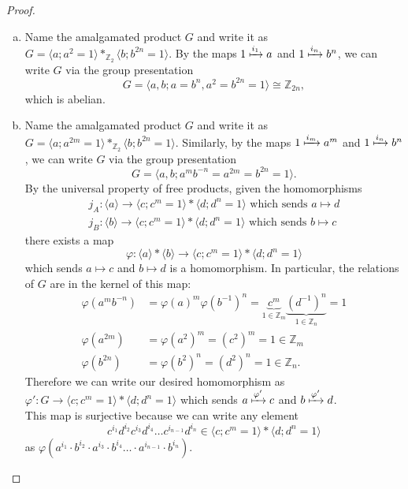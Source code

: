 \documentclass{article}
\begin{document}
\begin{proof} \text{} \\
  \begin{enumerate}[a.]
    \item Name the amalgamated product $G$ and write it as
    $G = \langle a; a^2 = 1\rangle *_{\mathbb Z_2} \langle b; b^{2n} = 1\rangle$.
    By the maps $1 \xmapsto{i_1} a$ and $1 \xmapsto{i_n} b^n$, we can write
    $G$ via the group presentation \[
      G = \langle a, b; a = b^n, a^2 = b^{2n} = 1 \rangle \cong \mathbb Z_{2n},
    \]
    which is abelian.
    \item Name the amalgamated product $G$ and write it as
    $G = \langle a; a^{2m} = 1\rangle *_{\mathbb Z_2} \langle b; b^{2n} = 1\rangle$.
    Similarly, by the maps
    $1 \xmapsto{i_m} a^m$ and $1 \xmapsto{i_n} b^n$, we can write $G$ via the
    group presentation \[
      G = \langle a, b; a^mb^{-n} = a^{2m} = b^{2n} = 1 \rangle.
    \]
    By the universal property of free products, given the homomorphisms \begin{align*}
      j_A \colon \langle a \rangle \rightarrow
      \langle c; c^{m} = 1 \rangle
      * \langle d; d^{n} = 1 \rangle
      \text{ which sends } a \mapsto d
      \\
      j_B \colon \langle b \rangle \rightarrow
      \langle c; c^{m} = 1 \rangle
      * \langle d; d^{n} = 1 \rangle
      \text{ which sends } b \mapsto c
    \end{align*}
    there exists a map \[
      \varphi\colon \langle a \rangle * \langle b \rangle
      \rightarrow \langle c; c^{m} = 1 \rangle * \langle d; d^{n} = 1 \rangle
    \] which sends $a \mapsto c$ and $b \mapsto d$ is a homomorphism.
    In particular, the relations of $G$ are in the kernel of this map: \begin{align*}
      \varphi(a^m b^{-n})
        &= \varphi(a)^m\varphi(b^{-1})^n
        = \underbrace{c^m}_{1 \in \mathbb Z_m} \underbrace{(d^{-1})^n}_{1 \in \mathbb Z_n}
        = 1
      \\
      \varphi(a^{2m})
        &= \varphi(a^2)^m
        = (c^2)^m
        = 1 \in \mathbb Z_m
      \\
      \varphi(b^{2n})
        &= \varphi(b^2)^n
        = (d^2)^n
        = 1 \in \mathbb Z_n.
    \end{align*}
    Therefore we can write our desired homomorphism as
    $\varphi'\colon G \rightarrow \langle c; c^{m} = 1 \rangle * \langle d; d^{n} = 1 \rangle$
    which sends $a\xmapsto{\varphi'}c$ and $b\xmapsto{\varphi'}d$.
    \\
    This map is surjective because we can write any element \[
      c^{i_1}d^{i_2}c^{i_3}d^{i_4}\hdots c^{i_{n-1}}d^{i_n} \in
      \langle c; c^m = 1 \rangle * \langle d; d^n = 1 \rangle
    \]
    as $\varphi(a^{i_1}\cdot b^{i_2}\cdot a^{i_3}\cdot b^{i_4}\hdots \cdot a^{i_{n-1}}\cdot b^{i_n})$.


\end{enumerate}
\end{proof}
\end{document}
